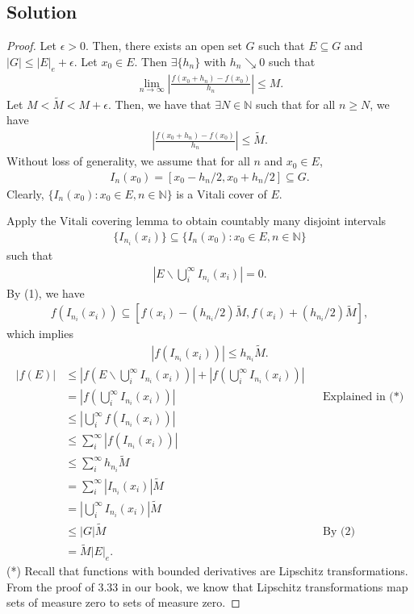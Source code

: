 \documentclass[10pt,a4paper]{article}
\theoremstyle{theorem}
\theoremstyle{definition}
\begin{document}
\subsection*{Solution}
\begin{proof}
Let $\epsilon > 0$. Then, there exists an open set $G$ such that $E \subseteq G$ and $|G| \leq |E|_e + \epsilon$. Let $x_0 \in E$. Then $\exists \{h_n\}$ with $h_n \searrow 0$ such that 
\begin{align*}
 \lim_{n \to \infty} \left|\frac{f(x_0 + h_n) - f(x_0)}{h_n} \right| \leq M.
\end{align*}
Let $M < \tilde{M} < M + \epsilon$. Then, we have that $\exists N \in \mathbb{N}$ such that for all $n \geq N$, we have
\begin{align}
\left|\frac{f(x_0 + h_n) - f(x_0)}{h_n} \right| \leq \tilde{M}.
\end{align}
Without loss of generality, we assume that for all $n$ and $x_0 \in E$,
\begin{align}
I_n(x_0) = [x_0 - h_n/2, x_0 + h_n/2] \subseteq G.
\end{align}
Clearly, $\{I_n(x_0): x_0 \in E, n \in \mathbb{N}\}$ is a Vitali cover of $E$.

Apply the Vitali covering lemma to obtain countably many disjoint intervals
\begin{align*}
\{I_{n_i}(x_i)\} \subseteq \{I_n(x_0): x_0 \in E, n \in \mathbb{N}\}
\end{align*}
such that
\begin{align*}
\left| E \backslash \bigcup _i^\infty I_{n_i}(x_i) \right| = 0.
\end{align*}
By (1), we have
\begin{align*}
f(I_{n_i}(x_i)) \subseteq [f(x_i) - (h_{n_i}/2) \tilde{M}, f(x_i) + (h_{n_i}/2) \tilde{M}],
\end{align*}
which implies
\begin{align*}
|f(I_{n_i}(x_i))| \leq h_{n_i} \tilde{M}.
\end{align*}
\begin{align*}
|f(E)| &\leq \left|f\left( E \backslash \bigcup _i^\infty I_{n_i}(x_i) \right) \right| + \left| f\left(\bigcup _i^\infty I_{n_i}(x_i) \right) \right|\\
&= \left| f\left(\bigcup _i^\infty I_{n_i}(x_i) \right) \right| &&\text{Explained in (*)}\\
&\leq \left| \bigcup _i^\infty f\left(I_{n_i}(x_i) \right) \right|\\
&\leq \sum_i^\infty |f\left(I_{n_i}(x_i) \right)|\\
&\leq \sum_i^\infty h_{n_i} \tilde{M}\\
&= \sum_i^\infty|I_{n_i}(x_i)|\tilde{M}\\
&= \left| \bigcup _i^\infty I_{n_i}(x_i) \right| \tilde{M}\\
&\leq |G| \tilde{M} &&\text{By (2)}\\
&= \tilde{M}|E|_e.
\end{align*}
(*) Recall that functions with bounded derivatives are Lipschitz transformations. From the proof of 3.33 in our book, we know that Lipschitz transformations map sets of measure zero to sets of measure zero.


\end{proof}
\end{document}
